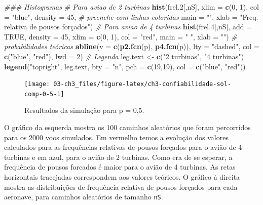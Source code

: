 \documentclass[
]{book}
\newenvironment{Shaded}{\begin{snugshade}}{\end{snugshade}}
\newcommand{\CommentTok}[1]{\textcolor[rgb]{0.56,0.35,0.01}{\textit{#1}}}
\newcommand{\DataTypeTok}[1]{\textcolor[rgb]{0.13,0.29,0.53}{#1}}
\newcommand{\DecValTok}[1]{\textcolor[rgb]{0.00,0.00,0.81}{#1}}
\newcommand{\FloatTok}[1]{\textcolor[rgb]{0.00,0.00,0.81}{#1}}
\newcommand{\KeywordTok}[1]{\textcolor[rgb]{0.13,0.29,0.53}{\textbf{#1}}}
\newcommand{\NormalTok}[1]{#1}
\newcommand{\OtherTok}[1]{\textcolor[rgb]{0.56,0.35,0.01}{#1}}
\newcommand{\StringTok}[1]{\textcolor[rgb]{0.31,0.60,0.02}{#1}}
\theoremstyle{definition}
\theoremstyle{definition}
\theoremstyle{definition}
\theoremstyle{remark}
\begin{document}
\begin{Shaded}
\begin{Highlighting}[]
\CommentTok{### Histogramas}
\CommentTok{# Para aviao de 2 turbinas}
\KeywordTok{hist}\NormalTok{(frel}\FloatTok{.2}\NormalTok{[,nS], }
     \DataTypeTok{xlim =} \KeywordTok{c}\NormalTok{(}\DecValTok{0}\NormalTok{, }\DecValTok{1}\NormalTok{), }\DataTypeTok{col =} \StringTok{"blue"}\NormalTok{,  }
     \DataTypeTok{density =} \DecValTok{45}\NormalTok{,  }\CommentTok{# preenche com linhas coloridas}
     \DataTypeTok{main =} \StringTok{""}\NormalTok{,}
     \DataTypeTok{xlab =} \StringTok{"Freq. relativa de pousos forçados"}\NormalTok{)}
\CommentTok{# Para aviao de 4 turbinas}
\KeywordTok{hist}\NormalTok{(frel}\FloatTok{.4}\NormalTok{[,nS], }\DataTypeTok{add =} \OtherTok{TRUE}\NormalTok{, }\DataTypeTok{density =} \DecValTok{45}\NormalTok{,}
     \DataTypeTok{xlim =} \KeywordTok{c}\NormalTok{(}\DecValTok{0}\NormalTok{, }\DecValTok{1}\NormalTok{), }\DataTypeTok{col =} \StringTok{"red"}\NormalTok{, }
     \DataTypeTok{main =} \StringTok{" "}\NormalTok{, }\DataTypeTok{xlab =} \StringTok{""}\NormalTok{)}
\CommentTok{# probabilidades teóricas}
\KeywordTok{abline}\NormalTok{(}\DataTypeTok{v =} \KeywordTok{c}\NormalTok{(}\KeywordTok{p2.fcn}\NormalTok{(p), }\KeywordTok{p4.fcn}\NormalTok{(p)),  }
       \DataTypeTok{lty =} \StringTok{"dashed"}\NormalTok{, }\DataTypeTok{col =} \KeywordTok{c}\NormalTok{(}\StringTok{"blue"}\NormalTok{, }\StringTok{"red"}\NormalTok{), }\DataTypeTok{lwd =} \DecValTok{2}\NormalTok{)}
\CommentTok{# Legenda}
\NormalTok{leg.text <-}\StringTok{ }\KeywordTok{c}\NormalTok{(}\StringTok{"2 turbinas"}\NormalTok{, }\StringTok{"4 turbinas"}\NormalTok{)}
\KeywordTok{legend}\NormalTok{(}\StringTok{"topright"}\NormalTok{, leg.text, }
       \DataTypeTok{bty =} \StringTok{"n"}\NormalTok{, }\DataTypeTok{pch =} \KeywordTok{c}\NormalTok{(}\DecValTok{19}\NormalTok{,}\DecValTok{19}\NormalTok{), }\DataTypeTok{col =} \KeywordTok{c}\NormalTok{(}\StringTok{"blue"}\NormalTok{, }\StringTok{"red"}\NormalTok{))}
\end{Highlighting}
\end{Shaded}

\begin{figure}
\texttt{[image: 03-ch3\_files/figure-latex/ch3-confiabilidade-sol-comp-0-5-1]} \caption{Resultados da simulação para p = 0,5.}\label{fig:ch3-confiabilidade-sol-comp-0-5}
\end{figure}

O gráfico da esquerda mostra os 100 caminhos aleatórios que foram percorridos para os 2000 voos simulados. Em vermelho temos a evolução dos valores calculados para as frequências relativas de pousos forçados para o avião de 4 turbinas e em azul, para o avião de 2 turbinas. Como era de se esperar, a frequência de pousos forcados é maior para o avião de 4 turbinas. As retas horizontais tracejadas correspondem aos valores teóricos. O gráfico à direita mostra as distribuições de frequência relativa de pousos forçados para cada aeronave, para caminhos aleatórios de tamanho \texttt{nS}.
\end{document}
